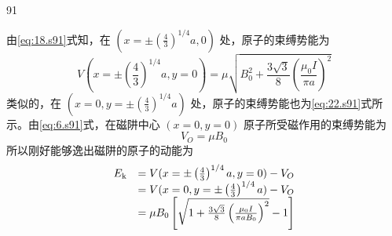 \begin{solution}{91}
\begin{subsolution}
由\eqref{eq:18.s91}式知，在 $(x = \pm \left(\frac{4}{3}\right)^{1 / 4}a,0)$ 处，原子的束缚势能为
\begin{equation}
V (x = \pm \left(\frac {4}{3}\right) ^ {1 / 4} a, y = 0) = \mu \sqrt {B _ {0} ^ {2} + \frac {3 \sqrt {3}}{8} \left(\frac {\mu_ {0} I}{\pi a}\right) ^ {2}}
\label{eq:22.s91}
\end{equation}
类似的，在 $(x = 0, y = \pm \left(\frac{4}{3}\right)^{1/4} a)$ 处，原子的束缚势能也为\eqref{eq:22.s91}式所示。由\eqref{eq:6.s91}式，在磁阱中心 $(x = 0, y = 0)$ 原子所受磁作用的束缚势能为
\begin{equation}
V _ {O} = \mu B _ {0}
\label{eq:23.s91}
\end{equation}
所以刚好能够逸出磁阱的原子的动能为
\begin{equation}
\begin{array}{r l} E _ {\mathrm{k}} & = V (x = \pm \left(\frac {4}{3}\right) ^ {1 / 4} a, y = 0) - V _ {O} \\ & = V (x = 0, y = \pm \left(\frac {4}{3}\right) ^ {1 / 4} a) - V _ {O} \\ & = \mu B _ {0} \left[ \sqrt {1 + \frac {3 \sqrt {3}}{8} \left(\frac {\mu_ {0} I}{\pi a B _ {0}}\right) ^ {2}} - 1 \right] \end{array}
\label{eq:24.s91}
\end{equation}
\end{subsolution}
\end{solution}